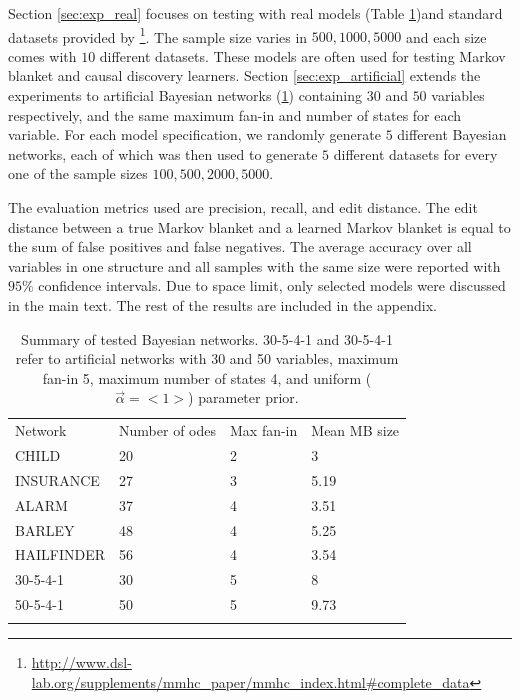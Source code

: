 Section \ref{sec:exp_real} focuses on testing with real models (Table \ref{tab:exp_models})and standard datasets provided by \footnote{\url{http://www.dsl-lab.org/supplements/mmhc_paper/mmhc_index.html\#complete_data}}. The sample size varies in $500, 1000, 5000$ and each size comes with $10$ different datasets. These models are often used for testing Markov blanket and causal discovery learners.  Section \ref{sec:exp_artificial} extends the experiments to artificial Bayesian networks (\ref{tab:exp_models}) containing $30$ and $50$ variables respectively, and the same maximum fan-in and number of states for each variable. For each model specification, we randomly generate $5$ different Bayesian networks, each of which was then used to generate $5$ different datasets for every one of the sample sizes $100, 500, 2000, 5000$. 

The evaluation metrics used are precision, recall, and edit distance. The edit distance between a true Markov blanket and a learned Markov blanket is equal to the sum of false positives and false negatives. The average accuracy over all variables in one structure and all samples with the same size were reported with $95\%$ confidence intervals. Due to space limit, only selected models were discussed in the main text. The rest of the results are included in the appendix. 
\begin{table}
\caption{Summary of tested Bayesian networks. 30-5-4-1 and 30-5-4-1 refer to artificial networks with 30 and 50 variables, maximum fan-in 5, maximum number of states 4, and uniform ($\vec{\alpha}=<1>$) parameter prior.}
\label{tab:exp_models}       
\begin{tabular}{llll}
\hline\noalign{\smallskip}
Network    & Number of odes & Max fan-in & Mean MB size  \\
\noalign{\smallskip}\hline\noalign{\smallskip}
CHILD      & 20    & 2  &  3 \\
INSURANCE & 27    & 3  &  5.19 \\
ALARM     & 37   & 4  & 3.51 \\  
BARLEY & 48 & 4 & 5.25 \\
HAILFINDER & 56 & 4 & 3.54 \\
30-5-4-1 & 30 & 5 & 8 \\
50-5-4-1 & 50 & 5 & 9.73 \\
\noalign{\smallskip}\hline
\end{tabular}
\end{table}


